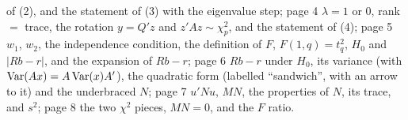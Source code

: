 \documentclass[11pt]{article}
\begin{document}
\begin{transcriptnotes}
        of (2), and the statement of (3) with the eigenvalue step; page 4 $\lambda = 1$
        or $0$, rank $=$ trace, the rotation $y = Q'z$ and $z'Az \sim \chi^{2}_{p}$,
        and the statement of (4); page 5 $w_{1}$, $w_{2}$, the independence
        condition, the definition of $F$, $F(1, q) = t_{q}^{2}$, $H_{0}$ and $|Rb - r|$,
        and the expansion of $Rb - r$; page 6 $Rb - r$ under $H_{0}$, its variance
        (with $\operatorname{Var}(Ax) = A\operatorname{Var}(x)A'$), the quadratic form (labelled
        ``sandwich'', with an arrow to it) and the underbraced $N$; page 7 $u'Nu$, $MN$, the properties of $N$, its trace, and
        $s^{2}$; page 8 the two $\chi^{2}$ pieces, $MN = 0$, and the $F$ ratio.
\end{transcriptnotes}
\end{document}
